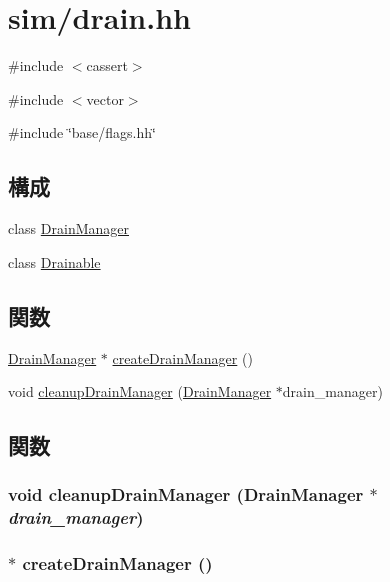 \hypertarget{drain_8hh}{
\section{sim/drain.hh}
\label{drain_8hh}
}
{\ttfamily \#include $<$cassert$>$}\par
{\ttfamily \#include $<$vector$>$}\par
{\ttfamily \#include \char`\"{}base/flags.hh\char`\"{}}\par
\subsection*{構成}
\begin{DoxyCompactItemize}
\item 
class \hyperlink{classDrainManager}{DrainManager}
\item 
class \hyperlink{classDrainable}{Drainable}
\end{DoxyCompactItemize}
\subsection*{関数}
\begin{DoxyCompactItemize}
\item 
\hyperlink{classDrainManager}{DrainManager} $\ast$ \hyperlink{drain_8hh_aefd1481c4f8838102ef5a839a5902021}{createDrainManager} ()
\item 
void \hyperlink{drain_8hh_adf8ed8715de91c0e64589fba5927549e}{cleanupDrainManager} (\hyperlink{classDrainManager}{DrainManager} $\ast$drain\_\-manager)
\end{DoxyCompactItemize}


\subsection{関数}
\hypertarget{drain_8hh_adf8ed8715de91c0e64589fba5927549e}{
\subsubsection[{cleanupDrainManager}]{\setlength{\rightskip}{0pt plus 5cm}void cleanupDrainManager ({\bf DrainManager} $\ast$ {\em drain\_\-manager})}}
\label{drain_8hh_adf8ed8715de91c0e64589fba5927549e}
\hypertarget{drain_8hh_aefd1481c4f8838102ef5a839a5902021}{
\subsubsection[{createDrainManager}]{$\ast$ createDrainManager ()}}
\label{drain_8hh_aefd1481c4f8838102ef5a839a5902021}
